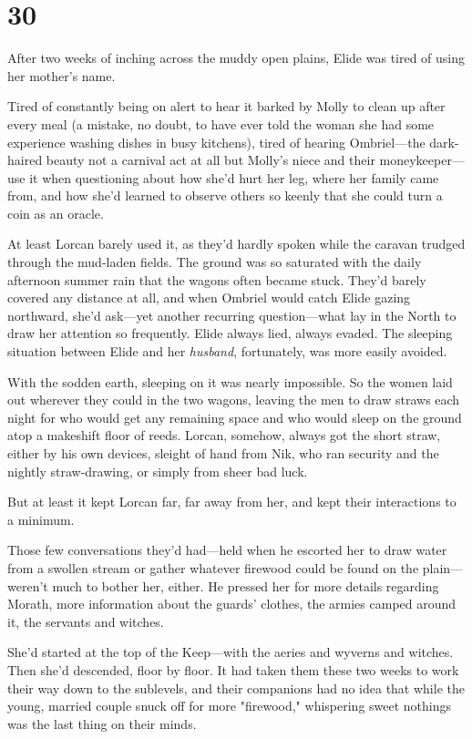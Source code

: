 
\chapter{30}

After two weeks of inching across the muddy open plains, Elide was tired of using her mother's name.

Tired of constantly being on alert to hear it barked by Molly to clean up after every meal (a mistake, no doubt, to have ever told the woman she had some experience washing dishes in busy kitchens), tired of hearing Ombriel---the dark-haired beauty not a carnival act at all but Molly's niece and their moneykeeper---use it when questioning about how she'd hurt her leg, where her family came from, and how she'd learned to observe others so keenly that she could turn a coin as an oracle.

At least Lorcan barely used it, as they'd hardly spoken while the caravan trudged through the mud-laden fields. The ground was so saturated with the daily afternoon summer rain that the wagons often became stuck. They'd barely covered any distance at all, and when Ombriel would catch Elide gazing northward, she'd ask---yet another recurring question---what lay in the North to draw her attention so frequently. Elide always lied, always evaded. The sleeping situation between Elide and her \emph{husband}, fortunately, was more easily avoided.

With the sodden earth, sleeping on it was nearly impossible. So the women laid out wherever they could in the two wagons, leaving the men to draw straws each night for who would get any remaining space and who would sleep on the ground atop a makeshift floor of reeds. Lorcan, somehow, always got the short straw, either by his own devices, sleight of hand from Nik, who ran security and the nightly straw-drawing, or simply from sheer bad luck.

But at least it kept Lorcan far, far away from her, and kept their interactions to a minimum.

Those few conversations they'd had---held when he escorted her to draw water from a swollen stream or gather whatever firewood could be found on the plain---weren't much to bother her, either. He pressed her for more details regarding Morath, more information about the guards' clothes, the armies camped around it, the servants and witches.

She'd started at the top of the Keep---with the aeries and wyverns and witches. Then she'd descended, floor by floor. It had taken them these two weeks to work their way down to the sublevels, and their companions had no idea that while the young, married couple snuck off for more "firewood," whispering sweet nothings was the last thing on their minds.


